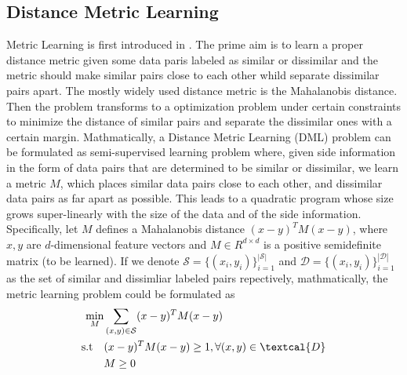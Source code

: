 \subsection{Distance Metric Learning}
Metric Learning is first introduced in \cite{Xing2002}. The prime aim is to learn a proper distance metric given some data paris labeled as similar or dissimilar and the metric should make similar pairs close to each other whild separate dissimilar pairs apart. The mostly widely used distance metric is the Mahalanobis distance. Then the problem transforms to a optimization problem under certain constraints to minimize the distance of similar pairs and separate the dissimilar ones with a certain margin. Mathmatically, a Distance Metric Learning (DML) problem can be formulated as semi-supervised learning problem where, given side information in the form of data pairs that are determined to be similar or dissimilar, we learn a metric $M$, which places similar data pairs close to each other, and dissimilar data pairs as far apart as possible. This leads to a quadratic program whose size grows super-linearly with the size of the data and of the side information. Specifically, let $M$ defines a Mahalanobis distance $(x−y)^TM(x−y)$, where $x, y$ are $d$-dimensional feature vectors and $M\in R^{d\times d}$ is a positive semidefinite matrix (to be learned). If we denote $\mathcal{S} =\{(x_i,y_i)\}_{i=1}^{|\mathcal{S}|}$ and $\mathcal{D} =\{(x_i,y_i)\}_{i=1}^{|\mathcal{D}|}$ as the set of similar and dissimliar labeled pairs repectively, mathmatically, the metric learning problem could be formulated as
\begin{eqnarray}
	\begin{split}
		\min_M & \sum_{(x,y)\in \mathcal{S}}(x-y)^TM(x-y)\\
		\textrm{s.t}\quad & (x-y)^TM(x-y)\geq 1, \forall(x,y)\in \textcal{D}\\
		 & M \geq 0
	\end{split}
\end{eqnarray}

